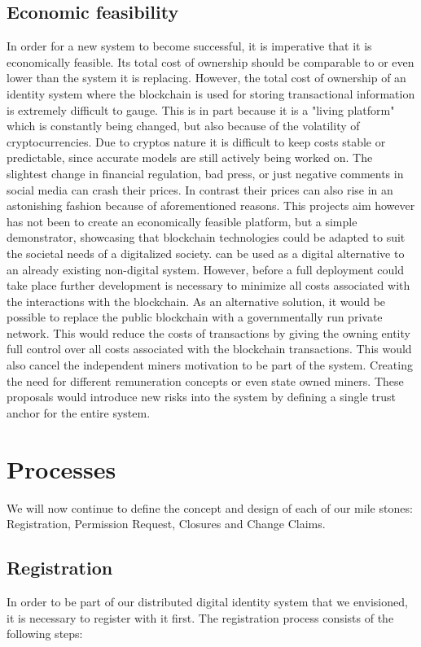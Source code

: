 \subsection{Economic feasibility}
\label{sec:economicFeasibility}
In order for a new system to become successful, it is imperative that it is economically feasible. Its total cost of ownership should be comparable to or even lower than the system it is replacing.
However, the total cost of ownership of an identity system where the blockchain is used for storing transactional information is extremely difficult to gauge. This is in part because it is a "living platform" which is constantly being changed, but also because of the volatility of cryptocurrencies.\cite{elendner2016cross}
Due to cryptos nature it is difficult to keep costs stable or predictable, since accurate models are still actively being worked on.\cite{catania2018predicting} The slightest change in financial regulation, bad press, or just negative comments in social media can crash their prices.\cite{kim2016predicting}
In contrast their prices can also rise in an astonishing fashion because of aforementioned reasons. 
This projects aim however has not been to create an economically feasible platform, but a simple demonstrator, showcasing that blockchain technologies could be adapted to suit the societal needs of a digitalized society. \projectName{} can be used as a digital alternative to an already existing non-digital system.
However, before a full deployment could take place further development is necessary to minimize all costs associated with the interactions with the blockchain.
As an alternative solution, it would be possible to replace the public blockchain with a governmentally run private network. This would reduce the costs of transactions by giving the owning entity full control over all costs associated with the blockchain transactions.
This would also cancel the independent miners motivation to be part of the system. Creating the need for different remuneration concepts or even state owned miners. These proposals would introduce new risks into the system by defining a single trust anchor for the entire system. 

\section{Processes}
We will now continue to define the concept and design of each of our mile stones: Registration, Permission Request, Closures and Change Claims. 

\subsection{Registration}
In order to be part of our distributed digital identity system that we envisioned, it is necessary to register with it first. The registration process consists of the following steps:

